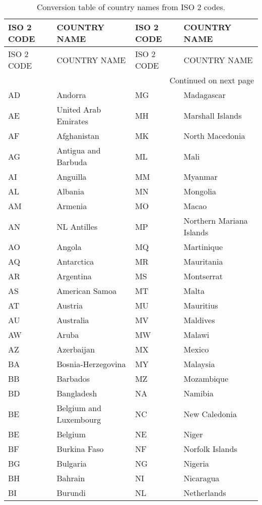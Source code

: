 {\tiny%
\begin{longtable}{lp{5cm}||lp{5cm}}
\caption{Conversion table of country names from ISO 2 codes.\label{tab:iso2}}

\toprule
ISO 2 CODE & COUNTRY NAME & ISO 2 CODE & COUNTRY NAME \\
\midrule
\endfirsthead

\toprule
ISO 2 CODE & COUNTRY NAME & ISO 2 CODE & COUNTRY NAME \\
\midrule
\endhead
\midrule
\multicolumn{4}{r}{{Continued on next page}} \\
\midrule
\endfoot

\bottomrule
\endlastfoot
 AD & Andorra & MG & Madagascar \\
 AE & United Arab Emirates & MH & Marshall Islands \\
 AF & Afghanistan & MK & North Macedonia \\
 AG & Antigua and Barbuda & ML & Mali \\
 AI & Anguilla & MM & Myanmar \\
 AL & Albania & MN & Mongolia \\
 AM & Armenia & MO & Macao \\
 AN & NL Antilles & MP & Northern Mariana Islands \\
 AO & Angola & MQ & Martinique \\
 AQ & Antarctica & MR & Mauritania \\
 AR & Argentina & MS & Montserrat \\
 AS & American Samoa & MT & Malta \\
 AT & Austria & MU & Mauritius \\
 AU & Australia & MV & Maldives \\
 AW & Aruba & MW & Malawi \\
 AZ & Azerbaijan & MX & Mexico \\
 BA & Bosnia-Herzegovina & MY & Malaysia \\
 BB & Barbados & MZ & Mozambique \\
 BD & Bangladesh & NA & Namibia \\
 BE & Belgium and Luxembourg & NC & New Caledonia \\
 BE & Belgium & NE & Niger \\
 BF & Burkina Faso & NF & Norfolk Islands \\
 BG & Bulgaria & NG & Nigeria \\
 BH & Bahrain & NI & Nicaragua \\
 BI & Burundi & NL & Netherlands \\

\end{longtable}}
